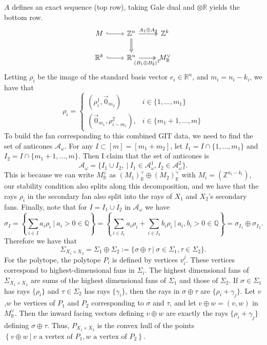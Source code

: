 \documentclass{article}
\newcommand{\Z}{\mathbb{Z}}
\newcommand{\R}{\mathbb{R}}
\newcommand{\cA}{\mathcal{A}}
\begin{document}
$A$ defines an exact sequence (top row), taking Gale dual and $\otimes \R$ yields the bottom row.
\[\begin{tikzcd}
	M & {\Z^{n}} & {\Z^k} \\
	{\R^k} & {\R^n} & {M_\R^\vee}
	\arrow[hook, from=1-1, to=1-2]
	\arrow["{A_1\oplus A_2}", two heads, from=1-2, to=1-3]
	\arrow[Rightarrow, from=1-2, to=2-2]
	\arrow[hook, from=2-1, to=2-2]
	\arrow["{(B_1\oplus B_2)^T}"', two heads, from=2-2, to=2-3]
\end{tikzcd}\]
Letting $\rho_i$ be the image of the standard basis vector $e_i \in \R^n$, and $m_i = n_i-k_i$, we have that
$$\rho_i = \begin{cases}
    (\rho^1_i, \vec{0}_{m_2}) & i\in \{1,...,m_1\}\\
    (\vec{0}_{m_1}, \rho^2_{i-m_1}), & i\in\{m_1+1,...,m\} 
\end{cases}$$
To build the fan corresponding to this combined GIT data, we need to find the set of anticones $\cA_\omega$. For any $I\subset [m]=[m_1+m_2]$, let $I_1 = I\cap\{1,...,m_1\}$ and $I_2 = I\cap\{m_1+1,...,m\}$. Then I claim that the set of anticones is 
$$\cA_\omega = \{I_1 \cup I_2, ~|~ I_1 \in \cA^1_{\omega}, I_2 \in \cA^{2}_\omega \}.$$
This is because we can write $M_\R^\vee$ as $(M_1)_\R^\vee \oplus (M_2)_\R^\vee$ with $M_i = (\Z^{n_i - k_i})$, our stability condition also splits along this decomposition, and we have that the rays $\rho_i$ in the secondary fan also split into the rays of $X_1$ and $X_2$'s secondary fans. Finally, note that for $I = I_1\cup I_2$ in $\mathcal{A}_\omega$ we have
$$\sigma_I = \left\{\sum_{i\in I} a_i \rho_i ~|~ a_i>0 \in \mathbb{Q} \right\} = \left\{\sum_{i\in I_1}a_i \rho_i + \sum_{i\in I_2}b_i\rho_i ~|~ a_i,b_i>0\in\mathbb{Q}\right\} = \sigma_{I_1} \oplus \sigma_{I_2}.$$
Therefore we have that 
$$\Sigma_{X_1\times X_2} = \Sigma_1 \oplus \Sigma_2 := \{\sigma \oplus \tau ~|~ \sigma \in \Sigma_1, \tau \in \Sigma_2\}.$$
For the polytope, the polytope $P_i$ is defined by vertices $v^j_i$. These vertices correspond to highest-dimensional fans in $\Sigma_i$. The highest dimensional fans of $\Sigma_{X_1\times X_2}$ are sums of the highest dimensional fans of $\Sigma_1$ and those of $\Sigma_2$. If $\sigma \in \Sigma_1$ has rays $\{\rho_i\}$ and $\tau \in \Sigma_2$ has rays $\{\gamma_i\}$, then the rays in $\sigma\oplus\tau$ are $\{\rho_i+\gamma_j\}$. Let $v$,$w$ be vertices of $P_1$ and $P_2$ corresponding to $\sigma$ and $\tau$, and let $v\oplus w = (v,w)$ in $M_\R^\vee$. Then the inward facing vectors defining $v\oplus w$ are exactly the rays $\{\rho_i+\gamma_j\}$ defining $\sigma\oplus \tau$. Thus, $P_{X_1\times X_2}$ is the convex hull of the points 
$\left\{
v\oplus w ~|~ v \text{ a vertex of }P_1, w \text{ a vertex of }P_2
\right\}$.
 
\end{document}
